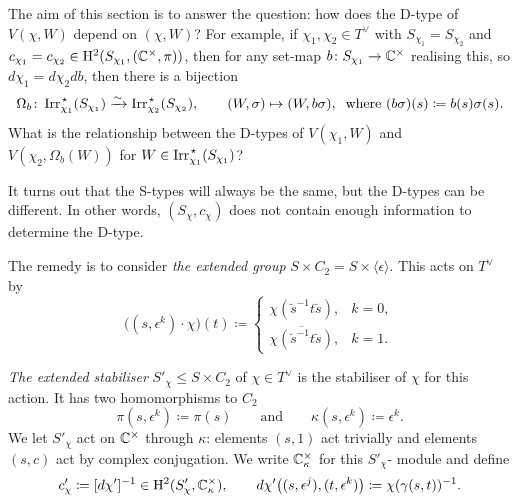 The aim of this section is to answer the question: how does the D-type of $V(\chi, W)$ depend on $(\chi,W)$? For example, if $\chi_1, \chi_2 \in T^{\vee}$ with $S_{\chi_1} = S_{\chi_2}$ and $c_{\chi_1} = c_{\chi_2} \in \mathrm{H}^2(S_{\chi_1}, ({\mathbb C}^{\times}, \pi))$, then for any set-map $b \colon S_{\chi_1} \rightarrow {\mathbb C}^{\times}$ realising this, so $d \chi_1 = d\chi_2 db$, then there is a bijection
\[
\Omega_b \colon \operatorname{Irr}_{\chi_1}^{\hspace{0.1em} \star}(S_{\chi_1}) \xrightarrow{\sim} \operatorname{Irr}_{\chi_2}^{\hspace{0.1em} \star}(S_{\chi_2}), \qquad (W, \sigma) \mapsto (W, b\sigma), \: \text{ where }  (b\sigma)(s) \coloneqq b(s) \sigma(s).
\]
What is the relationship between the D-types of $V(\chi_1, W)$ and $V(\chi_2, \Omega_b(W))$ for $W \in \operatorname{Irr}_{\chi_1}^{\hspace{0.1em} \star}(S_{\chi_1})$?

It turns out that the S-types will always be the same, but  the D-types can be different. In other words, $(S_{\chi}, c_{\chi})$ does  not contain enough information to determine the D-type.

%

The remedy is to consider {\em the extended group} $S \times C_2 = S \times \langle \epsilon \rangle$. This acts on $T^{\vee}$ by
\[
\big( (s, \epsilon^k) \cdot \chi \big)(t) \coloneqq \begin{cases} \chi(\breve{s}^{-1} t \breve{s}), & k = 0, \\ \overline{\chi(\breve{s}^{-1} t \breve{s})}, & k = 1. \end{cases}
\]

{\em The extended stabiliser} $S'_{\chi} \leq S \times C_2$ of $\chi \in T^{\vee}$ is the stabiliser of $\chi$ for this action. It has two homomorphisms to $C_2$
\[
\pi(s, \epsilon^k) \coloneqq \pi(s) \qquad \mbox{and} \qquad \kappa(s, \epsilon^k) \coloneqq \epsilon^k.
\]
We let $S'_{\chi}$ act on ${\mathbb C}^{\times}$ through $\kappa$: elements $(s,1)$ act trivially and elements $(s,c)$ act by complex conjugation. We write ${\mathbb C}^{\times}_{\kappa}$ for this $S'_{\chi}$- module and define
\[
c'_{\chi} \coloneqq [d \chi']^{-1} \in \mathrm{H}^2(S'_{\chi}, {\mathbb C}^{\times}_{\kappa}), \qquad d\chi'\big( (s,\epsilon^j), (t, \epsilon^k) \big) \coloneqq \chi(\gamma(s,t))^{-1}.
\]

